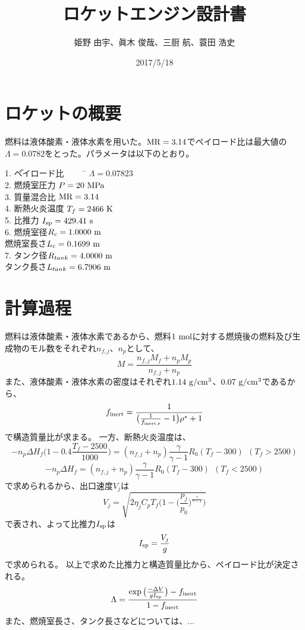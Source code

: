 \documentclass{jsarticle}
\begin{document}
\begin{titlepage}
\title{ロケットエンジン設計書}
\date{2017/5/18}
\author{姫野 由宇、眞木 俊哉、三厨 航、蓑田 浩史}
\maketitle
\thispagestyle{empty}
\end{titlepage}




\section{ロケットの概要}
燃料は液体酸素・液体水素を用いた。$\rm{MR}=3.14$でペイロード比は最大値の$\Lambda = 0.0782$をとった。パラメータは以下のとおり。

\begin{tabbing} 
1. \=ペイロード比 ~~~~ \= $\Lambda = 0.07823$\\

2. \>燃焼室圧力 \> $P = 20 ~\rm{MPa}$\\

3. \>質量混合比 \>$\rm{MR}=3.14$\\

4. \>断熱火炎温度 \>$T_f = 2466 ~ \rm{K}$\\

5. \>比推力 \>$I_{\rm{sp}}= 429.41~\rm{s}$\\

6. \>燃焼室径\>$R_c = 1.0000 ~ \rm{m}$\\

\>燃焼室長さ\>$L_c = 0.1699 ~ \rm{m}$\\

7. \>タンク径\>$R_{tank} = 4.0000 ~ \rm{m}$\\

\>タンク長さ\>$L_{tank} = 6.7906 ~ \rm{m}$\\
\end{tabbing} 

\section{計算過程}
燃料は液体酸素・液体水素であるから、燃料$1~\rm{mol}$に対する燃焼後の燃料及び生成物のモル数をそれぞれ$n_{f,j}$、$n_p$として、
\[
M = \frac{n_{f,j}M_f+n_pM_p}{n_{f,j}+n_p}
\]
また、液体酸素・液体水素の密度はそれぞれ$1.14 ~ \rm{g/cm^3}$、$0.07 ~ \rm{g/cm^3}$であるから、
\[
f_{\rm{inert}} = \frac{1}{\big(\frac{1}{f_{\rm{inert,s}}}-1\big)\rho^*+1}
\]
で構造質量比が求まる。
一方、断熱火炎温度は、
\[
-n_p\Delta H_f \Big( 1-0.4 \frac{T_f-2500}{1000} \Big) = (n_{f,j}+n_p)\frac{\gamma}{\gamma-1} R_0 (T_f-300) ~~ (T_f > 2500)
\]
\[
-n_p\Delta H_f = (n_{f,j}+n_p) \frac{\gamma}{\gamma-1} R_0 (T_f-300) ~~ (T_f < 2500)
\]
で求められるから、出口速度$V_j$は
\[
V_j = \sqrt{2\eta_j C_p T_f \Big( 1-\Big( \frac{p_j}{p_0}\Big)^{\frac{\gamma}{\gamma-1}} \Big)}
\]
で表され、よって比推力$I_{\rm{sp}}$は
\[
I_{\rm{sp}} = \frac{V_j}{g}
\]
で求められる。
以上で求めた比推力と構造質量比から、ペイロード比が決定される。
\[
\Lambda = \frac{\exp \big( {\frac{-\Delta V}{gI_{\rm{sp} } }}\big)-f_{\rm{inert}}}{1-f_{\rm{inert}}}
\]
また、燃焼室長さ、タンク長さなどについては、...
\end{document}
